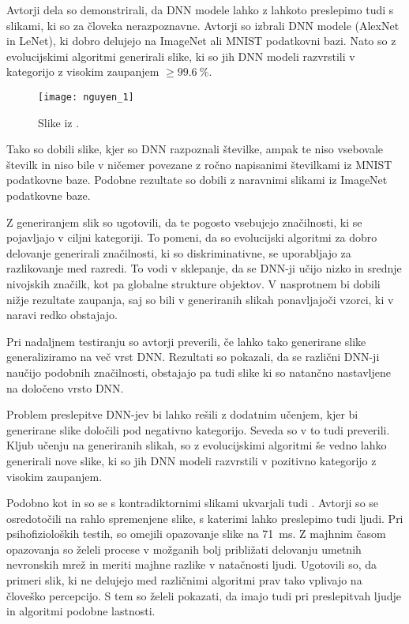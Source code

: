 Avtorji dela  \cite{nguyen2015deep} so demonstrirali, da DNN modele lahko z lahkoto preslepimo tudi s slikami, ki so za človeka nerazpoznavne. Avtorji so izbrali DNN modele (AlexNet in LeNet), ki dobro delujejo na ImageNet ali MNIST podatkovni bazi. Nato so z evolucijskimi algoritmi generirali slike, ki so jih DNN modeli razvrstili v kategorijo z visokim zaupanjem $\geq \SI{99.6}{\%}$. 

\begin{figure}[!htbp]
	\centering
	\texttt{[image: nguyen\_1]}
	\caption{Slike iz \cite{nguyen2015image}.}
\end{figure}

Tako so dobili slike, kjer so DNN razpoznali številke, ampak te niso vsebovale številk in niso bile v ničemer povezane z ročno napisanimi številkami iz MNIST podatkovne baze. Podobne rezultate so dobili z naravnimi slikami iz ImageNet podatkovne baze.

Z generiranjem slik so ugotovili, da te pogosto vsebujejo značilnosti, ki se pojavljajo v ciljni kategoriji. To pomeni, da so evolucijski algoritmi za dobro delovanje generirali značilnosti, ki so diskriminativne, se uporabljajo za razlikovanje med razredi. To vodi v sklepanje, da se DNN-ji učijo nizko in srednje nivojskih značilk, kot pa globalne strukture objektov. V nasprotnem bi dobili nižje rezultate zaupanja, saj so bili v generiranih slikah ponavljajoči vzorci, ki v naravi redko obstajajo.

Pri nadaljnem testiranju so avtorji preverili, če lahko tako generirane slike generaliziramo na več vrst DNN. Rezultati so pokazali, da se različni DNN-ji naučijo podobnih značilnosti, obstajajo pa tudi slike ki so natančno nastavljene na določeno vrsto DNN.

Problem preslepitve DNN-jev bi lahko rešili z dodatnim učenjem, kjer bi generirane slike določili pod negativno kategorijo. Seveda so v \cite{nguyen2015deep} to tudi preverili. Kljub učenju na generiranih slikah, so z evolucijskimi algoritmi še vedno lahko generirali nove slike, ki so jih DNN modeli razvrstili v pozitivno kategorijo z visokim zaupanjem.


Podobno kot \cite{szegedy2014intriguing} in \cite{goodfellow2015explaining} so se s kontradiktornimi slikami ukvarjali tudi \cite{elsayed2018adversarial}. Avtorji so se osredotočili na rahlo spremenjene slike, s katerimi lahko preslepimo tudi ljudi. Pri psihofizioloških testih, so omejili opazovanje slike na \SI{71}{\ms}. Z majhnim časom opazovanja so želeli procese v možganih bolj približati delovanju umetnih nevronskih mrež in meriti majhne razlike v natačnosti ljudi. Ugotovili so, da primeri slik, ki ne delujejo med različnimi algoritmi prav tako vplivajo na človeško percepcijo. S tem so želeli pokazati, da imajo tudi pri preslepitvah ljudje in algoritmi podobne lastnosti.  




